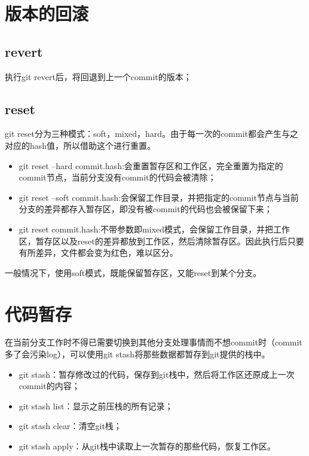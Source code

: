 \documentclass[cn,hazy,blue,14pt,通用]{elegantnote}
\begin{document}
\section{版本的回滚}
    \subsection{revert}
        执行git revert后，将回退到上一个commit的版本；
    \subsection{reset}
        git reset分为三种模式：soft，mixed，hard。由于每一次的commit都会产生与之对应的hash值，所以借助这个进行重置。

        \begin{itemize}
            \item git reset --hard commit.hash:会重置暂存区和工作区，完全重置为指定的commit节点，当前分支没有commit的代码会被清除；
            \item git reset --soft commit.hash:会保留工作目录，并把指定的commit节点与当前分支的差异都存入暂存区，即没有被commit的代码也会被保留下来；
            \item git reset commit.hash:不带参数即mixed模式，会保留工作目录，并把工作区，暂存区以及reset的差异都放到工作区，然后清除暂存区。因此执行后只要有所差异，文件都会变为红色，难以区分。
        \end{itemize}
        一般情况下，使用soft模式，既能保留暂存区，又能reset到某个分支。
\section{代码暂存}
    在当前分支工作时不得已需要切换到其他分支处理事情而不想commit时（commit多了会污染log），可以使用git stash将那些数据都暂存到git提供的栈中。
    \begin{itemize}
        \item git stash：暂存修改过的代码，保存到git栈中，然后将工作区还原成上一次commit的内容；
        \item git stash list：显示之前压栈的所有记录；
        \item git stash clear：清空git栈；
        \item git stash apply：从git栈中读取上一次暂存的那些代码，恢复工作区。
    \end{itemize}
\end{document}
